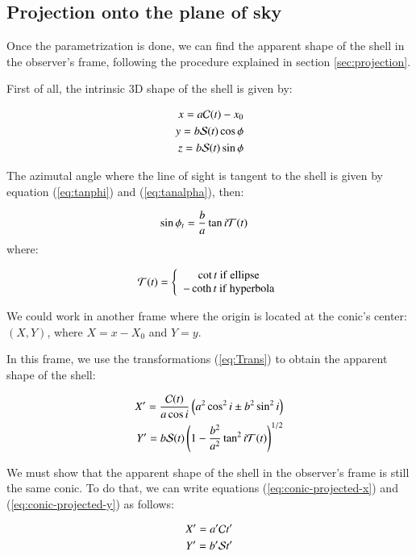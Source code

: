 \subsection{Projection onto the plane of sky} 

Once the parametrization is done, we can find the apparent shape of the shell in the observer's frame, following the procedure explained in section \ref{sec:projection}.

First of all, the intrinsic 3D shape of the shell is given by:

\begin{align}
x = a\mathcal{C}(t)-x_0 \\ 
y = b\mathcal{S}(t)\cos\phi \\
z =  b\mathcal{S}(t)\sin\phi
\end{align}

The azimutal angle where the line of sight is tangent to the shell is given by equation (\ref{eq:tanphi}) and (\ref{eq:tanalpha}), then:

\begin{align}
\sin\phi_t &= \frac{b}{a}\tan i\mathcal{T}(t) 
\end{align}
where:

\begin{align}
\mathcal{T}(t) = \left\lbrace \begin{array}{c}
\cot t ~\mathrm{if~ellipse} \\
-\coth t ~\mathrm{if~hyperbola}
\end{array}\right.
\end{align}

We could work in another frame   where the origin is located at the conic's center: $(X,Y)$, where $X=x-X_0$ and $Y=y$.

In this frame,  we use the transformations (\ref{eq:Trans})  to obtain the apparent shape of the shell:

\begin{align}
X' = \frac{\mathcal{C}(t)}{a\cos i}\left(a^2\cos^2 i \pm b^2\sin^2 i\right)  \label{eq:conic-projected-x}\\
Y'= b\mathcal{S}(t)\left(1-\frac{b^2}{a^2}\tan^2 i\mathcal{T}(t)\right)^{1/2}
\label{eq:conic-projected-y}
\end{align}


We must show that the apparent shape of the shell in the observer's frame is still the same conic. To do that, we can write equations
(\ref{eq:conic-projected-x}) and (\ref{eq:conic-projected-y}) as follows:

\begin{align}
X' = a'\mathcal{C} t' \label{eq:conic-projected-x-2} \\
Y' = b'\mathcal{S} t' \label{eq:conic-projected-y-2}
\end{align}

